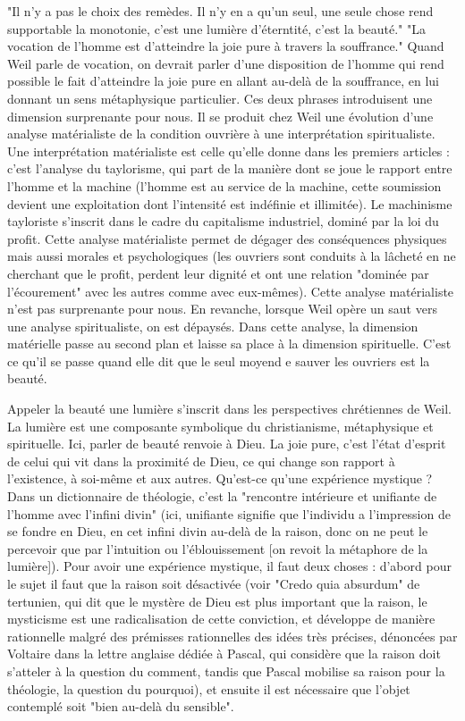 \documentclass[a4paper,12pt]{book}
\begin{document}
\par "Il n'y a pas le choix des remèdes. Il n'y en a qu'un seul, une seule chose rend supportable la monotonie, c'est une lumière d'éterntité, c'est la beauté." "La vocation de l'homme est d'atteindre la joie pure à travers la souffrance." Quand Weil parle de vocation, on devrait parler d'une disposition de l'homme qui rend possible le fait d'atteindre la joie pure en allant au-delà de la souffrance, en lui donnant un sens métaphysique particulier. Ces deux phrases introduisent une dimension surprenante pour nous. Il se produit chez Weil une évolution d'une analyse matérialiste de la condition ouvrière à une interprétation spiritualiste. Une interprétation matérialiste est celle qu'elle donne dans les premiers articles : c'est l'analyse du taylorisme, qui part de la manière dont se joue le rapport entre l'homme et la machine (l'homme est au service de la machine, cette soumission devient une exploitation dont l'intensité est indéfinie et illimitée). Le machinisme tayloriste s'inscrit dans le cadre du capitalisme industriel, dominé par la loi du profit. Cette analyse matérialiste permet de dégager des conséquences physiques mais aussi morales et psychologiques (les ouvriers sont conduits à la lâcheté en ne cherchant que le profit, perdent leur dignité et ont une relation "dominée par l'écourement" avec les autres comme avec eux-mêmes). Cette analyse matérialiste n'est pas surprenante pour nous. En revanche, lorsque Weil opère un saut vers une analyse spiritualiste, on est dépaysés. Dans cette analyse, la dimension matérielle passe au second plan et laisse sa place à la dimension spirituelle. C'est ce qu'il se passe quand elle dit que le seul moyend e sauver les ouvriers est la beauté.
\par Appeler la beauté une lumière s'inscrit dans les perspectives chrétiennes de Weil. La lumière est une composante symbolique du christianisme, métaphysique et spirituelle. Ici, parler de beauté renvoie à Dieu. La joie pure, c'est l'état d'esprit de celui qui vit dans la proximité de Dieu, ce qui change son rapport à l'existence, à soi-même et aux autres. Qu'est-ce qu'une expérience mystique ? Dans un dictionnaire de théologie, c'est la "rencontre intérieure et unifiante de l'homme avec l'infini divin" (ici, unifiante signifie que l'individu a l'impression de se fondre en Dieu, en cet infini divin au-delà de la raison, donc on ne peut le percevoir que par l'intuition ou l'éblouissement [on revoit la métaphore de la lumière]). Pour avoir une expérience mystique, il faut deux choses : d'abord pour le sujet il faut que la raison soit désactivée (voir "Credo quia absurdum" de tertunien, qui dit que le mystère de Dieu est plus important que la raison, le mysticisme est une radicalisation de cette conviction, et développe de manière rationnelle malgré des prémisses rationnelles des idées très précises, dénoncées par Voltaire dans la lettre anglaise dédiée à Pascal, qui considère que la raison doit s'atteler à la question du comment, tandis que Pascal mobilise sa raison pour la théologie, la question du pourquoi), et ensuite il est nécessaire que l'objet contemplé soit "bien au-delà du sensible".
\end{document}
